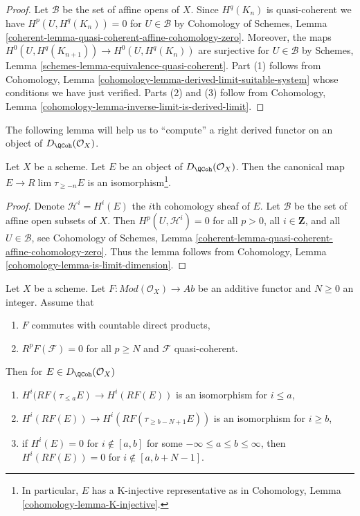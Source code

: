 \begin{proof}
Let $\mathcal{B}$ be the set of affine opens of $X$.
Since $H^q(K_n)$ is quasi-coherent we have $H^p(U, H^q(K_n)) = 0$
for $U \in \mathcal{B}$ by Cohomology of Schemes, Lemma
\ref{coherent-lemma-quasi-coherent-affine-cohomology-zero}.
Moreover, the maps $H^0(U, H^q(K_{n + 1})) \to H^0(U, H^q(K_n))$
are surjective for $U \in \mathcal{B}$ by
Schemes, Lemma \ref{schemes-lemma-equivalence-quasi-coherent}.
Part (1) follows from Cohomology, Lemma
\ref{cohomology-lemma-derived-limit-suitable-system}
whose conditions we have just verified.
Parts (2) and (3) follow from
Cohomology, Lemma \ref{cohomology-lemma-inverse-limit-is-derived-limit}.
\end{proof}

\noindent
The following lemma will help us to ``compute'' a right derived functor
on an object of $D_\QCoh(\mathcal{O}_X)$.

\begin{lemma}
\label{lemma-nice-K-injective}
Let $X$ be a scheme. Let $E$ be an object of
$D_\QCoh(\mathcal{O}_X)$. Then the canonical map
$E \to R\lim \tau_{\geq -n}E$ is an isomorphism\footnote{In particular,
$E$ has a K-injective representative as in
Cohomology, Lemma \ref{cohomology-lemma-K-injective}.}.
\end{lemma}

\begin{proof}
Denote $\mathcal{H}^i = H^i(E)$ the $i$th cohomology sheaf of $E$.
Let $\mathcal{B}$ be the set of affine open subsets of $X$. Then
$H^p(U, \mathcal{H}^i) = 0$ for all $p > 0$, all $i \in \mathbf{Z}$,
and all $U \in \mathcal{B}$, see
Cohomology of Schemes, Lemma
\ref{coherent-lemma-quasi-coherent-affine-cohomology-zero}.
Thus the lemma follows from
Cohomology, Lemma \ref{cohomology-lemma-is-limit-dimension}.
\end{proof}

\begin{lemma}
\label{lemma-application-nice-K-injective}
Let $X$ be a scheme. Let $F : \textit{Mod}(\mathcal{O}_X) \to \textit{Ab}$
be an additive functor and $N \geq 0$ an integer. Assume that
\begin{enumerate}
\item $F$ commutes with countable direct products,
\item $R^pF(\mathcal{F}) = 0$ for all $p \geq N$ and $\mathcal{F}$
quasi-coherent.
\end{enumerate}
Then for $E \in D_\QCoh(\mathcal{O}_X)$
\begin{enumerate}
\item $H^i(RF(\tau_{\leq a}E) \to H^i(RF(E))$ is an isomorphism
for $i \leq a$,
\item $H^i(RF(E)) \to H^i(RF(\tau_{\geq b - N + 1}E))$ is an isomorphism
for $i \geq b$,
\item if $H^i(E) = 0$ for $i \not \in [a, b]$ for some
$-\infty \leq a \leq b \leq \infty$, then $H^i(RF(E)) = 0$
for $i \not \in [a, b + N - 1]$.
\end{enumerate}
\end{lemma}

